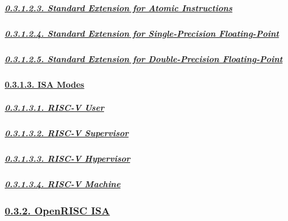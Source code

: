 \documentclass[
]{article}
\begin{document}
\hypertarget{standard-extension-for-atomic-instructions}{%
\subparagraph{\texorpdfstring{\protect\hyperlink{standard-extension-for-atomic-instructions-1}{0.3.1.2.3.
Standard Extension for Atomic
Instructions}}{0.3.1.2.3. Standard Extension for Atomic Instructions}}\label{standard-extension-for-atomic-instructions}}

\hypertarget{standard-extension-for-single-precision-floating-point}{%
\subparagraph{\texorpdfstring{\protect\hyperlink{standard-extension-for-single-precision-floating-point-1}{0.3.1.2.4.
Standard Extension for Single-Precision
Floating-Point}}{0.3.1.2.4. Standard Extension for Single-Precision Floating-Point}}\label{standard-extension-for-single-precision-floating-point}}

\hypertarget{standard-extension-for-double-precision-floating-point}{%
\subparagraph{\texorpdfstring{\protect\hyperlink{standard-extension-for-double-precision-floating-point-1}{0.3.1.2.5.
Standard Extension for Double-Precision
Floating-Point}}{0.3.1.2.5. Standard Extension for Double-Precision Floating-Point}}\label{standard-extension-for-double-precision-floating-point}}

\hypertarget{isa-modes}{%
\paragraph{\texorpdfstring{\protect\hyperlink{isa-modes-3}{0.3.1.3. ISA
Modes}}{0.3.1.3. ISA Modes}}\label{isa-modes}}

\hypertarget{risc-v-user}{%
\subparagraph{\texorpdfstring{\protect\hyperlink{risc-v-user-1}{0.3.1.3.1.
RISC-V User}}{0.3.1.3.1. RISC-V User}}\label{risc-v-user}}

\hypertarget{risc-v-supervisor}{%
\subparagraph{\texorpdfstring{\protect\hyperlink{risc-v-supervisor-1}{0.3.1.3.2.
RISC-V
Supervisor}}{0.3.1.3.2. RISC-V Supervisor}}\label{risc-v-supervisor}}

\hypertarget{risc-v-hypervisor}{%
\subparagraph{\texorpdfstring{\protect\hyperlink{risc-v-hypervisor-1}{0.3.1.3.3.
RISC-V
Hypervisor}}{0.3.1.3.3. RISC-V Hypervisor}}\label{risc-v-hypervisor}}

\hypertarget{risc-v-machine}{%
\subparagraph{\texorpdfstring{\protect\hyperlink{risc-v-machine-1}{0.3.1.3.4.
RISC-V Machine}}{0.3.1.3.4. RISC-V Machine}}\label{risc-v-machine}}

\hypertarget{openrisc-isa}{%
\subsubsection{\texorpdfstring{\protect\hyperlink{openrisc-isa-1}{0.3.2.
OpenRISC ISA}}{0.3.2. OpenRISC ISA}}\label{openrisc-isa}}
\end{document}
